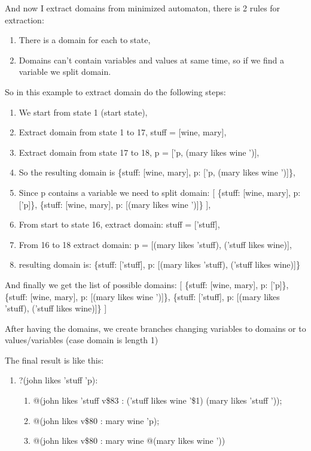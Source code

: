 \documentclass{article}
\begin{document}
And now I extract domains from minimized automaton, there is 2 rules for extraction:

\begin{enumerate}
\item There is a domain for each to state,
\item Domains can't contain variables and values at same time, so if we find a variable we split domain.
\end{enumerate}

So in this example to extract domain do the following steps:

\begin{enumerate}
\item We start from state 1 (start state),
\item Extract domain from state 1 to 17, stuff = [wine, mary],
\item Extract domain from state 17 to 18, p = ['p, (mary likes wine ')],
\item So the resulting domain is \{stuff: [wine, mary], p: ['p, (mary likes wine ')]\},
\item Since p contains a variable we need to split domain: [
      \{stuff: [wine, mary], p: ['p]\},
      \{stuff: [wine, mary], p: [(mary likes wine ')]\}
],
\item From start to state 16, extract domain: stuff = ['stuff],
\item From 16 to 18 extract domain: p = [(mary likes 'stuff), ('stuff likes wine)],
\item resulting domain is: \{stuff: ['stuff], p: [(mary likes 'stuff), ('stuff likes wine)]\}
\end{enumerate}

And finally we get the list of possible domains:
[
      \{stuff: [wine, mary], p: ['p]\},
      \{stuff: [wine, mary], p: [(mary likes wine ')]\},
      \{stuff: ['stuff], p: [(mary likes 'stuff), ('stuff likes wine)]\}
]

After having the domains, we create branches changing variables to domains or 
to values/variables (case domain is length 1)

The final result is like this: 

\begin{enumerate}
\item ?(john likes 'stuff 'p): 
      \begin{enumerate}
      \item @(john likes 'stuff {{v\$83 : ('stuff likes wine '\$1) (mary likes 'stuff ')}});
      \item @(john likes {{v\$80 : mary wine}} 'p);
      \item @(john likes {{v\$80 : mary wine}} @(mary likes wine '))
      \end{enumerate}
\end{enumerate}
\end{document}
